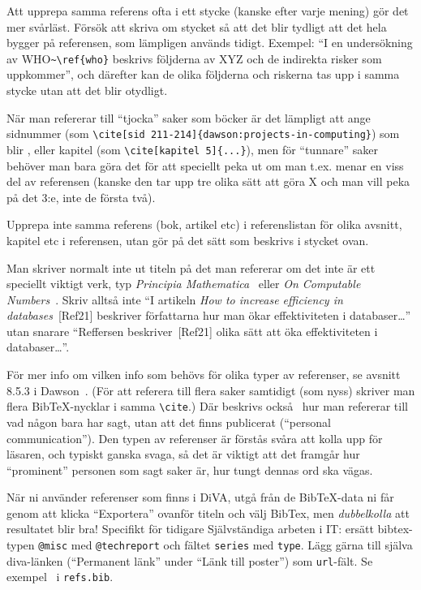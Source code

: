 Att upprepa samma referens ofta i ett stycke (kanske efter varje mening) gör det mer svårläst. Försök att skriva om stycket så att det blir tydligt att det hela bygger på referensen, som lämpligen används tidigt. Exempel: ``I en undersökning av WHO\verb|~\ref{who}| beskrivs följderna av XYZ och de indirekta risker som uppkommer'', och därefter kan de olika följderna och riskerna tas upp i samma stycke utan att det blir otydligt.

När man refererar till ``tjocka'' saker som böcker är det lämpligt att ange sidnummer 
(som \verb|\cite[sid 211-214]{dawson:projects-in-computing}|) som blir \cite[sid 211-214]{dawson:projects-in-computing}, eller kapitel (som \verb|\cite[kapitel 5]{...}|), men för ``tunnare'' saker behöver man bara göra det för att speciellt peka ut om man t.ex. menar en viss del av referensen (kanske den tar upp tre olika sätt att göra X och man vill peka på det 3:e, inte de första två).

Upprepa inte samma referens (bok, artikel etc) i referenslistan för olika avsnitt, kapitel etc i referensen, utan gör på det sätt som beskrivs i stycket ovan.

Man skriver normalt inte ut titeln på det man refererar om det inte är ett speciellt viktigt verk, typ \emph{Principia Mathematica}~\cite{whitehead.russel:principia-mathematica} eller \emph{On Computable Numbers}~\cite{turing:computable-numbers}. Skriv alltså inte ``I artikeln \emph{How to increase efficiency in databases}~[Ref21] beskriver författarna hur man ökar effektiviteten i databaser\ldots'' utan snarare ``Reffersen beskriver~[Ref21] olika sätt att öka effektiviteten i databaser\ldots''.

För mer info om vilken info som behövs för olika typer av referenser, se avsnitt 8.5.3 i Dawson~\cite{dawson:projects-in-computing,dawson:projects-in-computing-old}. (För att referera till flera saker samtidigt (som nyss) skriver man flera BibTeX-nycklar i samma \verb|\cite|.) 
Där beskrivs också~\cite[sid 230]{dawson:projects-in-computing} hur man refererar till vad någon bara har sagt, utan att det finns publicerat (``personal communication''). Den typen av referenser är förstås svåra att kolla upp för läsaren, och typiskt ganska svaga, så det är viktigt att det framgår hur ``prominent'' personen som sagt saker är, hur tungt dennas ord ska vägas.

När ni använder referenser som finns i DiVA, utgå från de Bib\TeX-data ni får genom att klicka ``Exportera'' ovanför titeln och välj BibTex, men \emph{dubbelkolla} att resultatet blir bra! Specifikt för tidigare Självständiga arbeten i IT: ersätt bibtex-typen \verb|@misc| med \verb|@techreport| och fältet \verb|series| med \verb|type|. Lägg gärna till själva diva-länken (``Permanent länk'' under ``Länk till poster'') som \verb|url|-fält. Se exempel~\cite{Brane973772,Alstergren1439802} i \texttt{refs.bib}.


